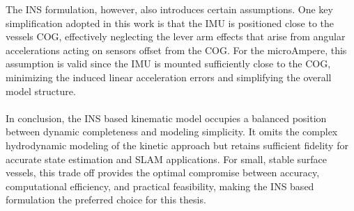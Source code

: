 The INS formulation, however, also introduces certain assumptions. One key simplification adopted in this work is that the IMU is positioned close to the vessels COG, effectively neglecting the lever arm effects that arise from angular accelerations acting on sensors offset from the COG. For the microAmpere, this assumption is valid since the IMU is mounted sufficiently close to the COG, minimizing the induced linear acceleration errors and simplifying the overall model structure.  
\\ \\
In conclusion, the INS based kinematic model occupies a balanced position between dynamic completeness and modeling simplicity. It omits the complex hydrodynamic modeling of the kinetic approach but retains sufficient fidelity for accurate state estimation and SLAM applications. For small, stable surface vessels, this trade off provides the optimal compromise between accuracy, computational efficiency, and practical feasibility, making the INS based formulation the preferred choice for this thesis.


